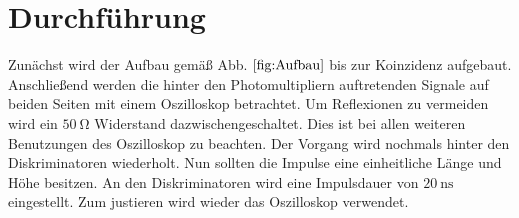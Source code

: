 
\section{Durchführung}
\label{sec:Durchführung}
Zunächst wird der Aufbau gemäß Abb. $\ref{fig:Aufbau}$ bis zur Koinzidenz aufgebaut. Anschließend werden die hinter den Photomultipliern auftretenden Signale auf beiden Seiten mit einem Oszilloskop betrachtet.
Um Reflexionen zu vermeiden wird ein $\SI{50}{\ohm}$ Widerstand dazwischengeschaltet. Dies ist bei allen weiteren Benutzungen des Oszilloskop zu beachten. Der Vorgang wird nochmals hinter den Diskriminatoren wiederholt. Nun sollten die Impulse eine einheitliche Länge und Höhe besitzen. An den Diskriminatoren wird eine Impulsdauer von $\SI{20}{\nano\second}$ eingestellt. Zum justieren wird wieder das Oszilloskop verwendet.
